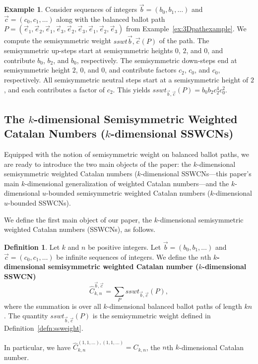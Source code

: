 \documentclass[11pt]{article}
\theoremstyle{remark}
\theoremstyle{definition}
\newtheorem{definition}[theorem]{Definition}
\newtheorem{example}[theorem]{Example}
\begin{document}
\begin{example}\label{ex:ComputeSSWT2}
Consider sequences of integers $\vec{b} = (b_0,b_1, \dots)$ and $\vec{c} = (c_0, c_1, \dots)$ along with the balanced ballot path $P = (\vec{e}_1, \vec{e}_2, \vec{e}_1, \vec{e}_3, \vec{e}_2, \vec{e}_3, \vec{e}_1, \vec{e}_2, \vec{e}_3)$ from Example~\ref{ex:3Dpathexample}. We compute the semisymmetric weight $sswt{\vec{b}, \vec{c}}(P)$ of the path. The semisymmetric up-steps start at semisymmetric heights $ 0$, $ 2$, and $0$, and contribute $b_0$, $b_2$, and $b_0$, respectively. The semisymmetric down-steps end at semisymmetric height $2$, $0$, and $0$, and contribute factors $c_2$, $c_0$, and $c_0$, respectively. All semisymmetric neutral steps start at a semisymmetric height of $2$, and each contributes a factor of $c_2$. This yields $sswt_{\vec{b}, \vec{c}}(P) = b_0 b_2 c_2^4c_0^2$.
\end{example}
\subsection{The \texorpdfstring{$k$}{k}-dimensional Semisymmetric Weighted Catalan Numbers (\texorpdfstring{$k$}{k}-dimensional SSWCNs)}\label{sec:MainObject}
Equipped with the notion of semisymmetric weight on balanced ballot paths, we are ready to introduce the two main objects of the paper: the $k$-dimensional semisymmetric weighted Catalan numbers ($k$-dimensional SSWCNs—this paper’s main $k$-dimensional generalization of weighted Catalan numbers—and the $k$-dimensional $u$-bounded semisymmetric weighted Catalan numbers ($k$-dimensional $u$-bounded SSWCNs).

We define the first main object of our paper, the $k$-dimensional semisymmetric weighted Catalan numbers (SSWCNs), as follows.

\begin{definition}\label{defn:kdimweighted}
Let $k$ and $n$ be positive integers. Let  $\vec{b} = (b_0, b_1, \dots)$ and $ \vec{c} = (c_0, c_1, \dots)$ be infinite sequences of integers. We define the $n$th \textbf{$k$-dimensional semisymmetric weighted Catalan number ($k$-dimensional SSWCN)} \[
\widehat{C}_{k,n}^{\vec{b}, \vec{c}} = \sum_P sswt_{\vec{b},\vec{c}}(P),
\] where the summation is over all $k$-dimensional balanced ballot paths of length $kn$. The quantity $sswt_{\vec{b}, \vec{c}}(P)$ is the semisymmetric weight defined in Definition~\ref{defn:ssweight}.
\end{definition}

In particular, we have $\widehat{C}_{k, n}^{(1, 1, \dots), (1, 1, \dots)} = C_{k, n}$, the $n$th $k$-dimensional Catalan number.
\end{document}
